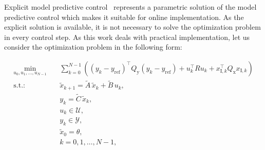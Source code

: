 \documentclass[preprint,12pt]{elsarticle}
\begin{document}
Explicit model predictive control~\cite{Bemporad_automatica} represents a parametric solution of the model predictive control which makes it suitable for online implementation. As the explicit solution is available, it is not necessary to solve the optimization problem in every control step. As this work deals with practical implementation, let us consider the optimization problem in the following form:

\begin{subequations}
	\label{eq:mpc_problem}
	\begin{eqnarray}
		\label{eq:mpc_problem_cost}
		\min_{u_0,u_{1},\ldots,u_{N-1}} &~& \! \sum_{k=0}^{N-1} \! \left( (y_k-y_\mathrm{ref})^{\intercal} Q_\mathrm{y} (y_k-y_\mathrm{ref}) + u_{k}^{\intercal} R u_{k} + x_{\mathrm{I},k}^{\intercal} Q_\mathrm{x} x_{\mathrm{I},k} \right)  \\
		\label{eq:mpc_problem_prediction_model_x}
		\mathrm{s.t.\!:} &~& \widetilde{x}_{k+1} = \widetilde{A}\,\widetilde{x}_{k} + \widetilde{B}\,u_{k}, \\
		\label{eq:mpc_problem_prediction_model_y}
		&~& y_{k} = \widetilde{C}\,\widetilde{x}_{k}, \\
		\label{eq:mpc_problem_input_constraints}
		&~& u_{k} \in \mathcal{U}, \\
		\label{eq:mpc_problem_state_constraints}
		&~& y_{k} \in \mathcal{Y}, \\
		\label{eq:mpc_problem_initial_coindition}
		&~& \widetilde{x}_{0} = \theta, \\
		\label{eq:mpc_problem_k_range}
		&~& k = 0,1,\ldots, N-1,
	\end{eqnarray}
\end{subequations}
\end{document}
